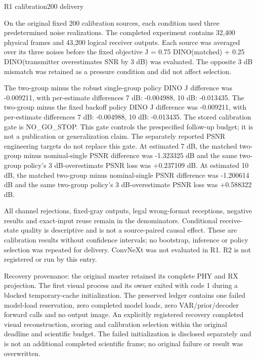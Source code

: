 R1 calibration200 delivery

On the original fixed 200 calibration sources, each condition used three predetermined noise realizations. The completed experiment contains 32,400 physical frames and 43,200 logical receiver outputs. Each source was averaged over its three noises before the fixed objective J = 0.75 DINO(matched) + 0.25 DINO(transmitter overestimates SNR by 3 dB) was evaluated. The opposite 3 dB mismatch was retained as a pressure condition and did not affect selection.

The two-group minus the robust single-group policy DINO J difference was -0.009211, with per-estimate differences 7 dB: -0.004988, 10 dB: -0.013435. The two-group minus the fixed backoff policy DINO J difference was -0.009211, with per-estimate differences 7 dB: -0.004988, 10 dB: -0.013435. The stored calibration gate is NO\_GO\_STOP. This gate controls the prespecified follow-up budget; it is not a publication or generalization claim. The separately reported PSNR engineering targets do not replace this gate. At estimated 7 dB, the matched two-group minus nominal-single PSNR difference was -1.323325 dB and the same two-group policy's 3 dB-overestimate PSNR loss was +0.237109 dB. At estimated 10 dB, the matched two-group minus nominal-single PSNR difference was -1.200614 dB and the same two-group policy's 3 dB-overestimate PSNR loss was +0.588322 dB.

All channel rejections, fixed-gray outputs, legal wrong-format receptions, negative results and exact-input reuse remain in the denominators. Conditional receive-state quality is descriptive and is not a source-paired causal effect. These are calibration results without confidence intervals; no bootstrap, inference or policy selection was repeated for delivery. ConvNeXt was not evaluated in R1. R2 is not registered or run by this entry.

Recovery provenance: the original master retained its complete PHY and RX projection. The first visual process and its owner exited with code 1 during a blocked temporary-cache initialization. The preserved ledger contains one failed model-load reservation, zero completed model loads, zero VAR/prior/decoder forward calls and no output image. An explicitly registered recovery completed visual reconstruction, scoring and calibration selection within the original deadline and scientific budget. The failed initialization is disclosed separately and is not an additional completed scientific frame; no original failure or result was overwritten.
